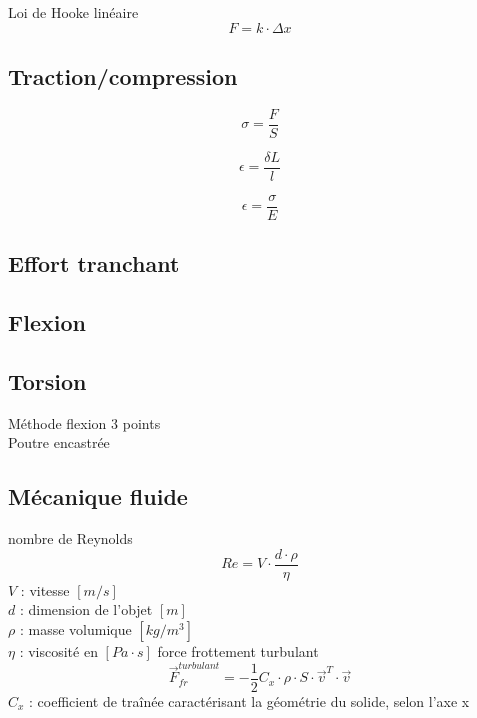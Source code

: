 	Loi de Hooke linéaire
	\begin{equation}
	F=k\cdot \Delta x
	\end{equation}
	
	\subsection{Traction/compression}
	\begin{equation}
	\sigma=\frac{F}{S}
	\end{equation}
	
	\begin{equation}
	\epsilon=\frac{\delta L}{l}
	\end{equation}
	
	\begin{equation}
	\epsilon=\frac{\sigma}{E}
	\end{equation}
	
	\subsection{Effort tranchant}
	\subsection{Flexion}
	
	\subsection{Torsion}
	
	Méthode flexion 3 points\\
	Poutre encastrée
	
	\subsection{Mécanique fluide}
	nombre de Reynolds
	\begin{equation}
	Re=V\cdot \frac{d \cdot \rho}{\eta}
	\end{equation}
	$V$ : vitesse $[m/s]$\\
	$d$ : dimension de l'objet $[m]$\\
	$\rho$ : masse volumique $[kg/m^3]$\\
	$\eta$ : viscosité en $[Pa \cdot s]$
	force frottement turbulant
	\begin{equation}
	\vec{F}_{fr}^{turbulant}=- \frac{1}{2} C_x \cdot \rho \cdot S \cdot \vec{v}^T \cdot \vec{v}
	\end{equation}
	$C_x$ : coefficient de traînée caractérisant la géométrie du solide, selon l'axe x\\
	
